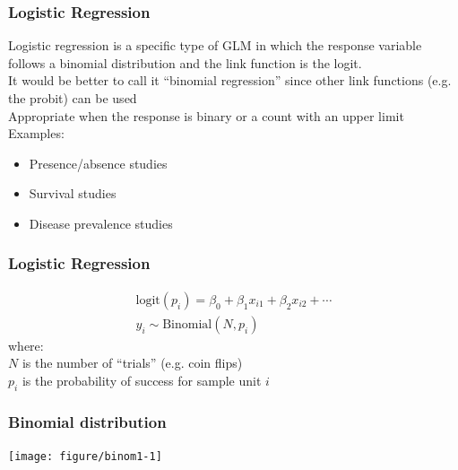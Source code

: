 \documentclass[color=usenames,dvipsnames]{beamer}\usepackage[]{graphicx}\usepackage[]{xcolor}
\newenvironment{knitrout}{}{} %
\begin{document}
\begin{frame}
  \frametitle{Logistic Regression}
  Logistic regression is a specific type of GLM in which the
      response variable follows a binomial distribution and the link
      function is the logit. \\
  \pause
  \vfill
  It would be better to call it ``binomial regression'' since other
      link functions (e.g. the probit) can be used \\
  \pause
  \vfill
  Appropriate when the response is binary or a count with an
  upper limit
  \pause
  \vfill
  {Examples:}
      \begin{itemize}
        \normalsize
        \item Presence/absence studies
        \item Survival studies
        \item Disease prevalence studies
      \end{itemize}
\end{frame}







\begin{frame}
  \frametitle{Logistic Regression}
    \begin{gather*}
      \mathrm{logit}(p_i) = \beta_0 + \beta_1 x_{i1} + \beta_2 x_{i2} + \cdots \\
      y_i \sim \mathrm{Binomial}(N, p_i)
  \end{gather*}
  \pause
  {where: \\}
  $N$ is the number of ``trials'' (e.g. coin flips) \\
  $p_i$ is the probability of success for sample unit $i$
\end{frame}



\begin{frame}[fragile]
  \frametitle{Binomial distribution}%
  \vspace{-0.4cm}
\begin{center}
\begin{knitrout}
\color{fgcolor}
\texttt{[image: figure/binom1-1]} 
\end{knitrout}
\end{center}
\vfill
\end{frame}
\end{document}
